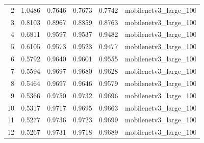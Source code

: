 \begin{tabular}{rrrrrl}
2 & 1.0486 & 0.7646 & 0.7673 & 0.7742 & mobilenetv3\_large\_100 \\
3 & 0.8103 & 0.8967 & 0.8859 & 0.8763 & mobilenetv3\_large\_100 \\
4 & 0.6811 & 0.9597 & 0.9537 & 0.9482 & mobilenetv3\_large\_100 \\
5 & 0.6105 & 0.9573 & 0.9523 & 0.9477 & mobilenetv3\_large\_100 \\
6 & 0.5792 & 0.9640 & 0.9601 & 0.9555 & mobilenetv3\_large\_100 \\
7 & 0.5594 & 0.9697 & 0.9680 & 0.9628 & mobilenetv3\_large\_100 \\
8 & 0.5464 & 0.9697 & 0.9646 & 0.9579 & mobilenetv3\_large\_100 \\
9 & 0.5366 & 0.9750 & 0.9732 & 0.9696 & mobilenetv3\_large\_100 \\
10 & 0.5317 & 0.9717 & 0.9695 & 0.9663 & mobilenetv3\_large\_100 \\
11 & 0.5277 & 0.9736 & 0.9723 & 0.9699 & mobilenetv3\_large\_100 \\
12 & 0.5267 & 0.9731 & 0.9718 & 0.9689 & mobilenetv3\_large\_100 \\
\bottomrule
\end{tabular}
